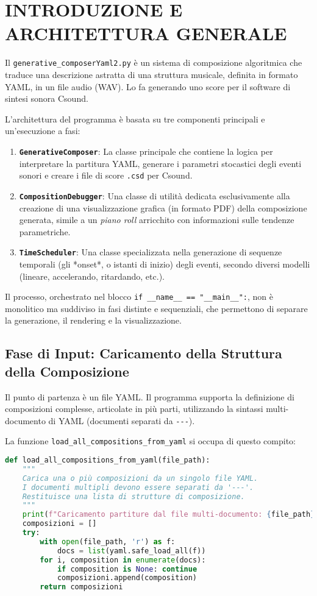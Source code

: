 
\section{INTRODUZIONE E ARCHITETTURA GENERALE}
Il \texttt{generative\_composerYaml2.py} è un sistema di composizione algoritmica che traduce una descrizione astratta di una struttura musicale, definita in formato YAML, in un file audio (WAV). Lo fa generando uno score per il software di sintesi sonora Csound.

L'architettura del programma è basata su tre componenti principali e un'esecuzione a fasi:

\begin{enumerate}
    \item \textbf{\texttt{GenerativeComposer}}: La classe principale che contiene la logica per interpretare la partitura YAML, generare i parametri stocastici degli eventi sonori e creare i file di score \texttt{.csd} per Csound.
    \item \textbf{\texttt{CompositionDebugger}}: Una classe di utilità dedicata esclusivamente alla creazione di una visualizzazione grafica (in formato PDF) della composizione generata, simile a un \textit{piano roll} arricchito con informazioni sulle tendenze parametriche.
    \item \textbf{\texttt{TimeScheduler}}: Una classe specializzata nella generazione di sequenze temporali (gli *onset*, o istanti di inizio) degli eventi, secondo diversi modelli (lineare, accelerando, ritardando, etc.).
\end{enumerate}
Il processo, orchestrato nel blocco \texttt{if \_\_name\_\_ == "\_\_main\_\_":}, non è monolitico ma suddiviso in fasi distinte e sequenziali, che permettono di separare la generazione, il rendering e la visualizzazione.
\subsection{Fase di Input: Caricamento della Struttura della Composizione}
Il punto di partenza è un file YAML. Il programma supporta la definizione di composizioni complesse, articolate in più parti, utilizzando la sintassi multi-documento di YAML (documenti separati da \texttt{{-}{-}{-}}).

La funzione \texttt{load\_all\_compositions\_from\_yaml} si occupa di questo compito:

\begin{lstlisting}[language=Python]
def load_all_compositions_from_yaml(file_path):
    """
    Carica una o più composizioni da un singolo file YAML.
    I documenti multipli devono essere separati da '---'.
    Restituisce una lista di strutture di composizione.
    """
    print(f"Caricamento partiture dal file multi-documento: {file_path}")
    composizioni = []
    try:
        with open(file_path, 'r') as f:
            docs = list(yaml.safe_load_all(f))
        for i, composition in enumerate(docs):
            if composition is None: continue 
            composizioni.append(composition)
        return composizioni
\end{lstlisting}

